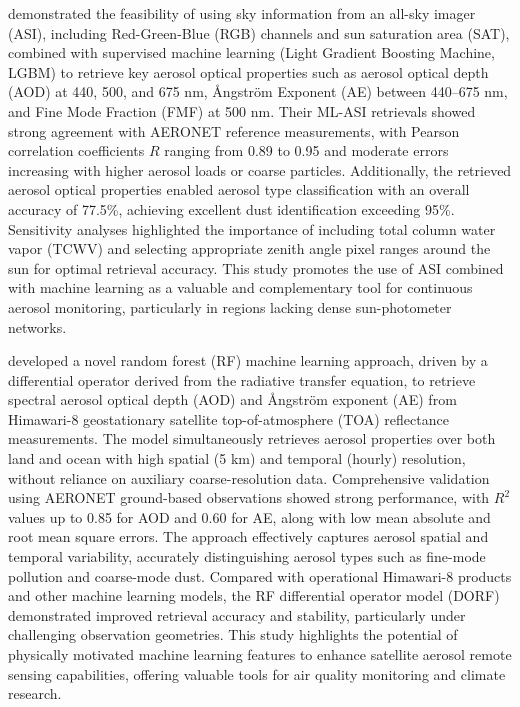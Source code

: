 \documentclass[11pt]{article}
\begin{document}
\citet{logothetis2023aerosol} demonstrated the feasibility of using sky information from an all-sky imager (ASI), including Red-Green-Blue (RGB) channels and sun saturation area (SAT), combined with supervised machine learning (Light Gradient Boosting Machine, LGBM) to retrieve key aerosol optical properties such as aerosol optical depth (AOD) at 440, 500, and 675 nm, Ångström Exponent (AE) between 440–675 nm, and Fine Mode Fraction (FMF) at 500 nm. Their ML-ASI retrievals showed strong agreement with AERONET reference measurements, with Pearson correlation coefficients \(R\) ranging from 0.89 to 0.95 and moderate errors increasing with higher aerosol loads or coarse particles. Additionally, the retrieved aerosol optical properties enabled aerosol type classification with an overall accuracy of 77.5\%, achieving excellent dust identification exceeding 95\%. Sensitivity analyses highlighted the importance of including total column water vapor (TCWV) and selecting appropriate zenith angle pixel ranges around the sun for optimal retrieval accuracy. This study promotes the use of ASI combined with machine learning as a valuable and complementary tool for continuous aerosol monitoring, particularly in regions lacking dense sun-photometer networks.

\citet{bao2023retrieval} developed a novel random forest (RF) machine learning approach, driven by a differential operator derived from the radiative transfer equation, to retrieve spectral aerosol optical depth (AOD) and Ångström exponent (AE) from Himawari-8 geostationary satellite top-of-atmosphere (TOA) reflectance measurements. The model simultaneously retrieves aerosol properties over both land and ocean with high spatial (5 km) and temporal (hourly) resolution, without reliance on auxiliary coarse-resolution data. Comprehensive validation using AERONET ground-based observations showed strong performance, with \(R^2\) values up to 0.85 for AOD and 0.60 for AE, along with low mean absolute and root mean square errors. The approach effectively captures aerosol spatial and temporal variability, accurately distinguishing aerosol types such as fine-mode pollution and coarse-mode dust. Compared with operational Himawari-8 products and other machine learning models, the RF differential operator model (DORF) demonstrated improved retrieval accuracy and stability, particularly under challenging observation geometries. This study highlights the potential of physically motivated machine learning features to enhance satellite aerosol remote sensing capabilities, offering valuable tools for air quality monitoring and climate research.
\end{document}

